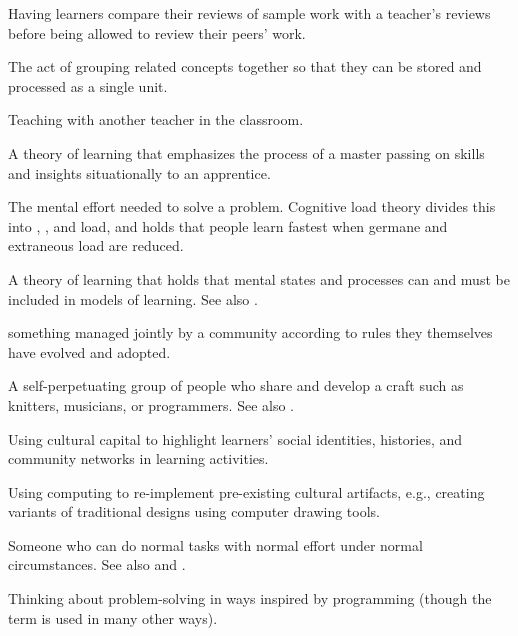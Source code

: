 \begin{description}
 Having learners
compare their reviews of sample work with a teacher's reviews before being
allowed to review their peers' work.

 The act of grouping related concepts together so
that they can be stored and processed as a single unit.

 Teaching with another teacher in the
classroom.

 A theory of
learning that emphasizes the process of a master passing on skills and insights
situationally to an apprentice.

 The mental effort needed to solve a problem.
Cognitive load theory divides this
into ,
,
and  load,
and holds that people learn fastest when germane and extraneous load are reduced.

 A theory of learning that holds that mental
states and processes can and must be included in models of learning. See also
.

 something managed jointly by a community according
to rules they themselves have evolved and adopted.

 A self-perpetuating
group of people who share and develop a craft such as knitters, musicians, or
programmers. See also
.

 Using cultural
capital to highlight learners' social identities, histories, and community
networks in learning activities.

 Using computing
to re-implement pre-existing cultural artifacts, e.g., creating variants of
traditional designs using computer drawing tools.

 Someone who can do
normal tasks with normal effort under normal circumstances.  See also
 and .

 Thinking about
problem-solving in ways inspired by programming (though the term is used in many
other ways).


\end{description}
